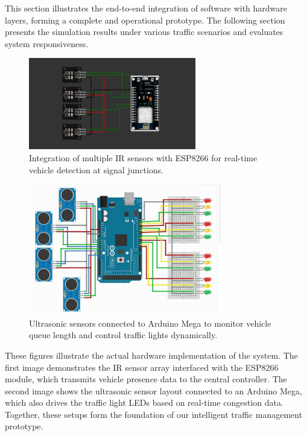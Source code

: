 \vspace{0.5cm}

This section illustrates the end-to-end integration of software with hardware layers, forming a complete and operational prototype. The following section presents the simulation results under various traffic scenarios and evaluates system responsiveness.
\begin{figure}[H]
\centering
\includegraphics[width=0.65\textwidth]{Figures/ir.png}
\caption{Integration of multiple IR sensors with ESP8266 for real-time vehicle detection at signal junctions.}
\label{fig:ir-integration}
\end{figure}

\begin{figure}[H]
\centering
\includegraphics[width=0.75\textwidth]{Figures/us.png}
\caption{Ultrasonic sensors connected to Arduino Mega to monitor vehicle queue length and control traffic lights dynamically.}
\label{fig:us-integration}
\end{figure}

\vspace{0.5cm}

These figures illustrate the actual hardware implementation of the system. The first image demonstrates the IR sensor array interfaced with the ESP8266 module, which transmits vehicle presence data to the central controller. The second image shows the ultrasonic sensor layout connected to an Arduino Mega, which also drives the traffic light LEDs based on real-time congestion data. Together, these setups form the foundation of our intelligent traffic management prototype.


\vspace{0.5cm}